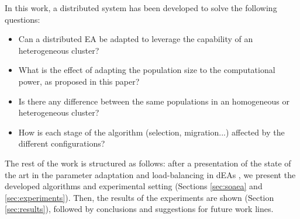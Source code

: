 

In this work, a distributed system has been developed to solve the following questions:
\begin{itemize}
 \item Can a distributed EA be adapted to leverage the capability of an heterogeneous cluster?
 \item What is the effect of adapting the population size to the computational power, as proposed in this paper? %
 \item Is there any difference between the same populations in an homogeneous or heterogeneous cluster?
 \item How is each stage of the algorithm (selection, migration...) affected by the different
   configurations? %
\end{itemize}


The rest of the work is structured as follows: after a presentation of
the state of
the art in the parameter adaptation and load-balancing in dEAs %
, we present the developed algorithms and experimental setting (Sections \ref{sec:soaea} and \ref{sec:experiments}). 
Then, the results of the experiments are shown (Section \ref{sec:results}), followed by conclusions and suggestions for future work lines.


